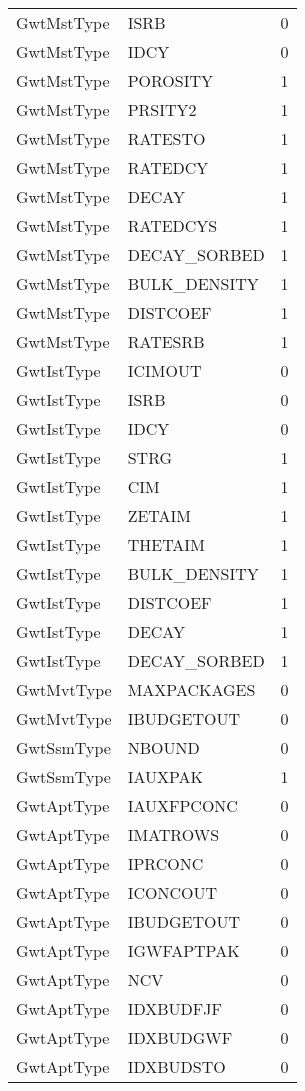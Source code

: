 \begin{longtable}{p{6cm} p{4cm} p{2cm} }
GwtMstType &  ISRB & 0 \\ 
GwtMstType &  IDCY & 0 \\ 
GwtMstType &  POROSITY & 1 \\ 
GwtMstType &  PRSITY2 & 1 \\ 
GwtMstType &  RATESTO & 1 \\ 
GwtMstType &  RATEDCY & 1 \\ 
GwtMstType &  DECAY & 1 \\ 
GwtMstType &  RATEDCYS & 1 \\ 
GwtMstType &  DECAY\_SORBED & 1 \\ 
GwtMstType &  BULK\_DENSITY & 1 \\ 
GwtMstType &  DISTCOEF & 1 \\ 
GwtMstType &  RATESRB & 1 \\ 
GwtIstType &  ICIMOUT & 0 \\ 
GwtIstType &  ISRB & 0 \\ 
GwtIstType &  IDCY & 0 \\ 
GwtIstType &  STRG & 1 \\ 
GwtIstType &  CIM & 1 \\ 
GwtIstType &  ZETAIM & 1 \\ 
GwtIstType &  THETAIM & 1 \\ 
GwtIstType &  BULK\_DENSITY & 1 \\ 
GwtIstType &  DISTCOEF & 1 \\ 
GwtIstType &  DECAY & 1 \\ 
GwtIstType &  DECAY\_SORBED & 1 \\ 
GwtMvtType &  MAXPACKAGES & 0 \\ 
GwtMvtType &  IBUDGETOUT & 0 \\ 
GwtSsmType &  NBOUND & 0 \\ 
GwtSsmType &  IAUXPAK & 1 \\ 
GwtAptType &  IAUXFPCONC & 0 \\ 
GwtAptType &  IMATROWS & 0 \\ 
GwtAptType &  IPRCONC & 0 \\ 
GwtAptType &  ICONCOUT & 0 \\ 
GwtAptType &  IBUDGETOUT & 0 \\ 
GwtAptType &  IGWFAPTPAK & 0 \\ 
GwtAptType &  NCV & 0 \\ 
GwtAptType &  IDXBUDFJF & 0 \\ 
GwtAptType &  IDXBUDGWF & 0 \\ 
GwtAptType &  IDXBUDSTO & 0 \\ 

\end{longtable}
